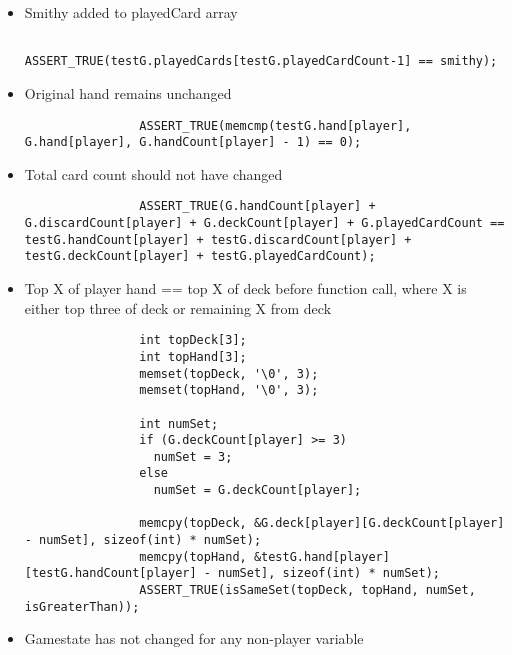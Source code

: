 \documentclass[11pt,letterpaper]{article}
\begin{document}
\begin{enumerate}[label=\arabic*., leftmargin=*]
\begin{itemize}[leftmargin=*]
\begin{itemize}[leftmargin=*]
\begin{itemize}[leftmargin=*]
              \item Smithy added to playedCard array
                \begin{lstlisting}
                ASSERT_TRUE(testG.playedCards[testG.playedCardCount-1] == smithy);
                \end{lstlisting}

              \item Original hand remains unchanged

                \begin{lstlisting}
                ASSERT_TRUE(memcmp(testG.hand[player], G.hand[player], G.handCount[player] - 1) == 0);
                \end{lstlisting}

              \item Total card count should not have changed

                \begin{lstlisting}
                ASSERT_TRUE(G.handCount[player] + G.discardCount[player] + G.deckCount[player] + G.playedCardCount == testG.handCount[player] + testG.discardCount[player] + testG.deckCount[player] + testG.playedCardCount);
                \end{lstlisting}

              \item Top X of player hand == top X of deck before function call, where X is either top three of deck or remaining X from deck

                \begin{lstlisting}
                int topDeck[3];
                int topHand[3];
                memset(topDeck, '\0', 3);
                memset(topHand, '\0', 3);

                int numSet;
                if (G.deckCount[player] >= 3)
                  numSet = 3;
                else
                  numSet = G.deckCount[player];

                memcpy(topDeck, &G.deck[player][G.deckCount[player] - numSet], sizeof(int) * numSet);
                memcpy(topHand, &testG.hand[player][testG.handCount[player] - numSet], sizeof(int) * numSet);
                ASSERT_TRUE(isSameSet(topDeck, topHand, numSet, isGreaterThan));
                \end{lstlisting}

              \item Gamestate has not changed for any non-player variable


\end{itemize}
\end{itemize}
\end{itemize}
\end{enumerate}
\end{document}
